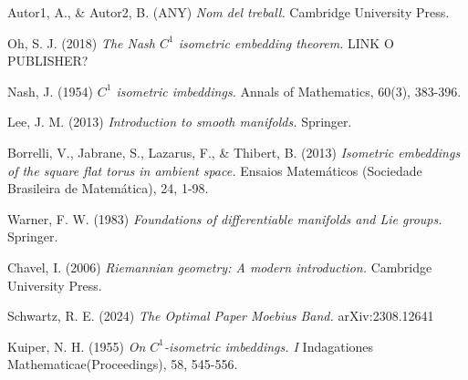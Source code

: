 \documentclass[11pt,a4paper,openright,oneside]{book}
\numberwithin{equation}{section}
\theoremstyle{definition}
\begin{document}
\newpage
\begin{thebibliography}{25}

{ \color{blue} 
Autor1, A., \& Autor2, B. (ANY)
\newblock \textit{Nom del treball.}
\newblock Cambridge University Press.
}

Oh, S. J. (2018)
\newblock \textit{The Nash $C^1$ isometric embedding theorem.}
\newblock LINK O PUBLISHER?

Nash, J. (1954)
\newblock \textit{$C^1$ isometric imbeddings.}
\newblock Annals of Mathematics, 60(3), 383-396.

Lee, J. M. (2013)
\newblock \textit{Introduction to smooth manifolds.}
\newblock Springer.

Borrelli, V., Jabrane, S., Lazarus, F., \& Thibert, B. (2013)
\newblock \textit{Isometric embeddings of the square flat torus in ambient space.}
\newblock Ensaios Matemáticos (Sociedade Brasileira de Matemática), 24, 1-98.

Warner, F. W. (1983)
\newblock \textit{Foundations of differentiable manifolds and Lie groups.}
\newblock Springer.

Chavel, I. (2006)
\newblock \textit{Riemannian geometry: A modern introduction.}
\newblock Cambridge University Press.

Schwartz, R. E. (2024)
\newblock \textit{The Optimal Paper Moebius Band.}
\newblock arXiv:2308.12641

Kuiper, N. H. (1955)
\newblock \textit{On $C^1$-isometric imbeddings. I}
\newblock Indagationes Mathematicae(Proceedings), 58, 545-556.



\end{thebibliography}
\end{document}
